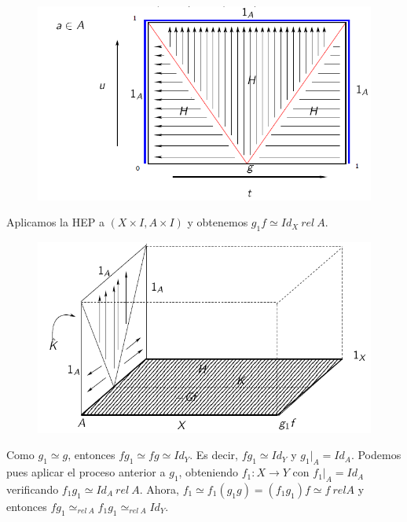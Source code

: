\documentclass[TA.tex]{subfiles}
\begin{document}
\begin{dem}
\begin{figure}[h!]
\includegraphics[scale=0.5]{tilde}
\end{figure}

Aplicamos la HEP a $(X\times I, A\times I)$ y obtenemos $g_1f\simeq Id_X\ rel\ A$. 
\begin{figure}[h!]
\includegraphics[scale=0.5]{rel}
\end{figure}

Como $g_1\simeq g$, entonces $fg_1\simeq fg\simeq Id_Y$. Es decir, $fg_1\simeq Id_Y$ y $g_1|_{A}=Id_A$. Podemos pues aplicar el proceso anterior a $g_1$, obteniendo $f_1:X\to Y$ con $f_1|_{A}=Id_A$ verificando $f_1g_1\simeq Id_A\ rel\ A$. Ahora, $f_1\simeq f_1(g_1g)=(f_1g_1)f\simeq f\ rel A$ y entonces $fg_1\simeq_{rel\ A}f_1g_1\simeq_{rel\ A}Id_Y$. 
\end{dem}
\end{document}
